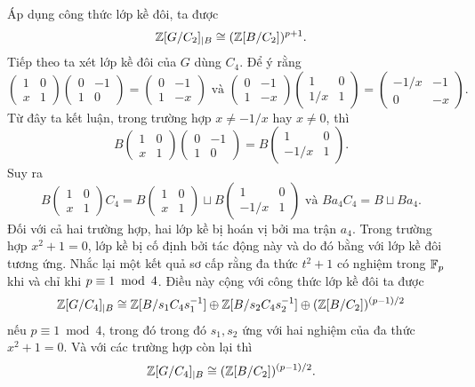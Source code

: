 Áp dụng công thức lớp kề đôi, ta được
$$
    \mathbb Z[G/C_2]_{|B} \cong (\mathbb Z[B/C_2])^{p+1}.
$$
Tiếp theo ta xét lớp kề đôi của $G$ dùng $C_4$. Để ý rằng
$$
    \begin{pmatrix}
        1 & 0 \\
        x & 1
    \end{pmatrix}\begin{pmatrix}
        0 & -1 \\
        1 & 0
    \end{pmatrix} =\begin{pmatrix}
        0 & -1 \\
        1 & -x
    \end{pmatrix} \text{ và } \begin{pmatrix}
        0 & -1 \\
        1 & -x
    \end{pmatrix}\begin{pmatrix}
        1   & 0 \\
        1/x & 1
    \end{pmatrix} =\begin{pmatrix}
        -1/x & -1 \\
        0    & -x
    \end{pmatrix}.
$$
Từ đây ta kết luận, trong trường hợp $x \neq -1/x$ hay $x \neq 0$, thì
$$
    B\begin{pmatrix}
        1 & 0 \\
        x & 1
    \end{pmatrix}\begin{pmatrix}
        0 & -1 \\
        1 & 0
    \end{pmatrix} =B\begin{pmatrix}
        1    & 0 \\
        -1/x & 1
    \end{pmatrix}.
$$
Suy ra
$$
    B\begin{pmatrix}
        1 & 0 \\
        x & 1
    \end{pmatrix} C_{4} =B\begin{pmatrix}
        1 & 0 \\
        x & 1
    \end{pmatrix} \sqcup B\begin{pmatrix}
        1    & 0 \\
        -1/x & 1
    \end{pmatrix}\text{ và } Ba_4C_4 = B \sqcup B a_4.
$$
Đối với cả hai trường hợp, hai lớp kề bị hoán vị bởi ma trận $a_4$. Trong trường hợp $x^2+1=0$, lớp kề bị cố định bởi tác động này và do đó bằng với lớp kề đôi tương ứng. Nhắc lại một kết quả sơ cấp rằng đa thức $t^2+1$ có nghiệm trong $\mathbb F_p$ khi và chỉ khi $p \equiv 1 \mmod 4$. Điều này cộng với công thức lớp kề đôi ta được
$$
    \mathbb Z[G/C_4]_{|B} \cong \mathbb Z[B/s_1 C_4 s_1^{-1}] \oplus \mathbb Z[B/s_2 C_4 s_2^{-1}] \oplus (\mathbb Z[B/C_2])^{(p-1)/2}
$$
nếu $p \equiv 1\ \operatorname*{mod}\ 4$, trong đó trong đó $s_1,s_2$ ứng với hai nghiệm của đa thức $x^2+1=0$. Và với các trường hợp còn lại thì
$$
    \mathbb Z[G/C_4]_{|B} \cong (\mathbb Z[B/C_2])^{(p-1)/2}.
$$

